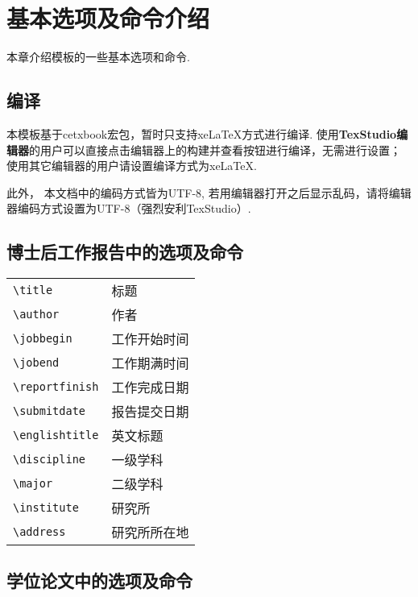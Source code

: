 \chapter{基本选项及命令介绍}\label{sec:basic}
本章介绍模板的一些基本选项和命令.

\section{编译}
本模板基于cetxbook宏包，暂时只支持xeLaTeX方式进行编译. 使用{\bfseries TexStudio编辑器}的用户可以直接点击编辑器上的构建并查看按钮进行编译，无需进行设置； 使用其它编辑器的用户请设置编译方式为xeLaTeX.

此外， 本文档中的编码方式皆为UTF-8, 若用编辑器打开之后显示乱码，请将编辑器编码方式设置为UTF-8（强烈安利TexStudio）.


\section{博士后工作报告中的选项及命令}
\begin{tabular}{p{5cm}p{9cm}}
   \verb|\title|         & 标题\\
   \verb|\author|        & 作者\\
   \verb|\jobbegin|      & 工作开始时间\\
   \verb|\jobend|        & 工作期满时间\\
   \verb|\reportfinish|  & 工作完成日期\\ 
   \verb|\submitdate|    & 报告提交日期\\
   \verb|\englishtitle|  & 英文标题\\
   \verb|\discipline|    & 一级学科\\
   \verb|\major|         & 二级学科\\
   \verb|\institute|     & 研究所\\
   \verb|\address|       & 研究所所在地\\
\end{tabular}
\section{学位论文中的选项及命令}
